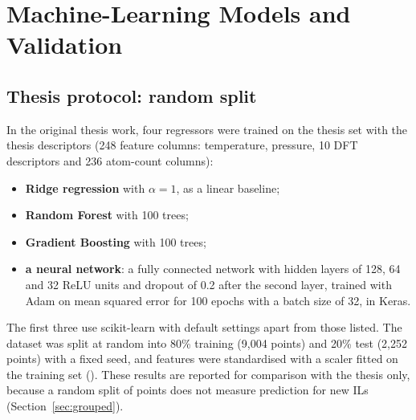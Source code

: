 \section{Machine-Learning Models and Validation}
\label{sec:models}

\subsection{Thesis protocol: random split}
In the original thesis work, four regressors were trained on the thesis set with the thesis descriptors (248 feature columns: temperature, pressure, 10 DFT descriptors and 236 atom-count columns):
\begin{itemize}
    \item \textbf{Ridge regression}\cite{hoerl1970ridge} with $\alpha = 1$, as a linear baseline;
    \item \textbf{Random Forest}\cite{breiman2001random} with 100 trees;
    \item \textbf{Gradient Boosting}\cite{friedman2001greedy} with 100 trees;
    \item \textbf{a neural network}: a fully connected network with hidden layers of 128, 64 and 32 ReLU units and dropout of 0.2 after the second layer, trained with Adam\cite{kingma2015adam} on mean squared error for 100 epochs with a batch size of 32, in Keras\cite{chollet2015keras}.
\end{itemize}
The first three use scikit-learn\cite{pedregosa2011scikit} with default settings apart from those listed. The dataset was split at random into 80\% training (9,004 points) and 20\% test (2,252 points) with a fixed seed, and features were standardised with a scaler fitted on the training set (). These results are reported for comparison with the thesis only, because a random split of points does not measure prediction for new ILs (Section~\ref{sec:grouped}).

